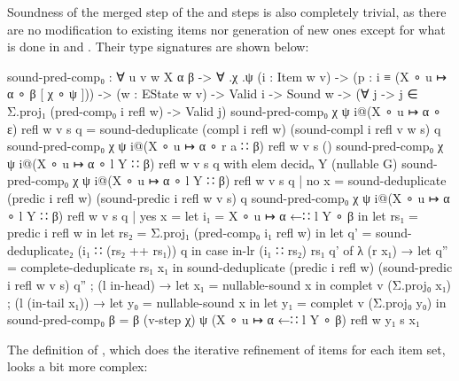 		Soundness of the merged step  of the 
		and  steps is also completely trivial, as there are no
		modification to existing items nor generation of new ones except for
		what is done in  and . Their type
		signatures are shown below: 

		\begin{code}
			  sound-pred-comp₀ : ∀ {u v w X α β} -> ∀ .χ .ψ
			    (i : Item w v) -> (p : i ≡ (X ∘ u ↦ α ∘ β [ χ ∘ ψ ])) ->
			    (w : EState w v) ->
			    Valid i -> Sound w ->
			    (∀ {j} -> j ∈ Σ.proj₁ (pred-comp₀ i refl w) -> Valid j)
			  sound-pred-comp₀ χ ψ i@(X ∘ u ↦ α ∘ ε) refl w v s q =
			    sound-deduplicate (compl i refl w) (sound-compl i refl v w s) q
			  sound-pred-comp₀ χ ψ i@(X ∘ u ↦ α ∘ r a ∷ β) refl w v s ()
			  sound-pred-comp₀ χ ψ i@(X ∘ u ↦ α ∘ l Y ∷ β) refl w v s q with elem decidₙ Y (nullable G)
			  sound-pred-comp₀ χ ψ i@(X ∘ u ↦ α ∘ l Y ∷ β) refl w v s q | no x =
			    sound-deduplicate (predic i refl w) (sound-predic i refl w v s) q
			  sound-pred-comp₀ χ ψ i@(X ∘ u ↦ α ∘ l Y ∷ β) refl w v s q | yes x =
			    let i₁ = X ∘ u ↦ α ←∷ l Y ∘ β in
			    let rs₁ = predic i refl w in
			    let rs₂ = Σ.proj₁ (pred-comp₀ i₁ refl w) in
			    let q' = sound-deduplicate₂ (i₁ ∷ (rs₂ ++ rs₁)) q in
			    case in-lr (i₁ ∷ rs₂) rs₁ q' of
			      λ { (r x₁) →
			          let q'' = complete-deduplicate rs₁ x₁ in
			          sound-deduplicate (predic i refl w) (sound-predic i refl w v s) q''
			        ; (l in-head) →
			          let x₁ = nullable-sound x in
			          complet v (Σ.proj₀ x₁)
			        ; (l (in-tail x₁)) →
			          let y₀ = nullable-sound x in
			          let y₁ = complet v (Σ.proj₀ y₀) in
			          sound-pred-comp₀ {β = β} (v-step χ) ψ (X ∘ u ↦ α ←∷ l Y ∘ β) refl w y₁ s x₁
			        }
		\end{code}

		The definition of , which does the iterative
		refinement of items for each item set, looks a bit more complex:

